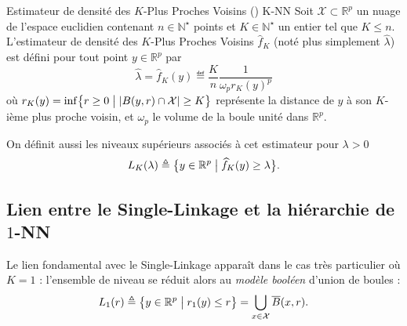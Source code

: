\begin{Definition}{Estimateur de densité des $K$-Plus Proches Voisins (\KNN) \cite{BiauDevroye}}{K-NN}
Soit $\mathcal X \subset \mathbb R^p $ un nuage de l'espace euclidien contenant $n\in \mathbb N^\star$ points et $K \in \mathbb N^\star$ un entier tel que $K \le n$. L'estimateur de densité des $K$-Plus Proches Voisins $\widehat f_{K}$ (noté plus simplement $\widehat \lambda$) est défini pour tout point $y \in \mathbb R^p$ par 
\[
\boxed{
    \widehat \lambda = \widehat f_{K}(y) \eqdef \frac{K}{n}  \frac{1}{\omega_p r_K(y)^p} 
}
\]
où $r_K(y) = \inf \bigl\{ r \ge 0 \bigm| \lvert B(y, r) \cap \mathcal X \rvert \ge K \bigr\}$ représente la distance de $y$ à son $K$-ième plus proche voisin, et $\omega_p$ le volume de la boule unité dans $\mathbb R^p$.

On définit aussi les niveaux supérieurs associés à cet estimateur pour $\lambda > 0$
\[
    L_K(\lambda) \triangleq \bigl\{ y \in \mathbb R^p \bigm|  \widehat f_K(y) \ge \lambda \bigr\}.
\]
\end{Definition}




\subsection{Lien entre le Single-Linkage et la hiérarchie de  $1$-NN}
\label{sec:lien_SL_HartiganNN}

Le lien fondamental avec le Single-Linkage apparaît dans le cas très particulier où $K=1$ : l'ensemble de niveau se réduit alors au \emph{modèle booléen} d'union de boules \cite{MeesterRoy} :
\[
    L_1(r) \triangleq \bigl\{ y \in \mathbb R^p \bigm| r_1(y) \le r \bigr\} = \bigcup_{x \in \mathcal X} \overline{B}(x, r).
\]

